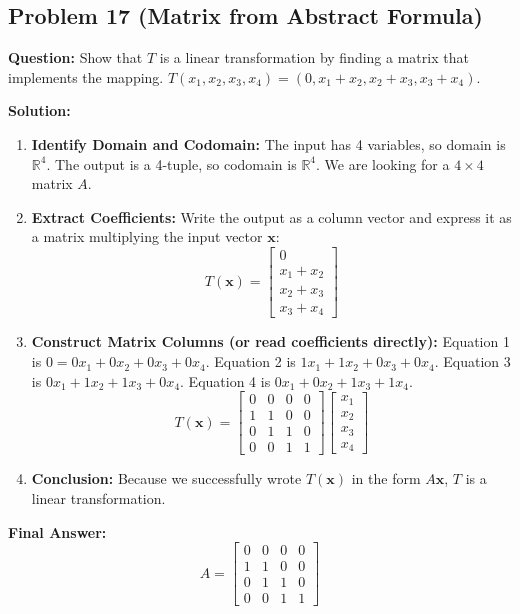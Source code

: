 \documentclass[11pt]{article}
\begin{document}
\subsection*{Problem 17 (Matrix from Abstract Formula)}
\textbf{Question:} Show that $T$ is a linear transformation by finding a matrix that implements the mapping. 
$T(x_1, x_2, x_3, x_4) = (0, x_1+x_2, x_2+x_3, x_3+x_4)$.

\textbf{Solution:}
\begin{enumerate}
    \item \textbf{Identify Domain and Codomain:} The input has 4 variables, so domain is $\mathbb{R}^4$. The output is a 4-tuple, so codomain is $\mathbb{R}^4$. We are looking for a $4 \times 4$ matrix $A$.
    \item \textbf{Extract Coefficients:} Write the output as a column vector and express it as a matrix multiplying the input vector $\mathbf{x}$:
    \[ T(\mathbf{x}) = \begin{bmatrix} 0 \\ x_1 + x_2 \\ x_2 + x_3 \\ x_3 + x_4 \end{bmatrix} \]
    \item \textbf{Construct Matrix Columns (or read coefficients directly):}
    Equation 1 is $0 = 0x_1 + 0x_2 + 0x_3 + 0x_4$.
    Equation 2 is $1x_1 + 1x_2 + 0x_3 + 0x_4$.
    Equation 3 is $0x_1 + 1x_2 + 1x_3 + 0x_4$.
    Equation 4 is $0x_1 + 0x_2 + 1x_3 + 1x_4$.
    \[ T(\mathbf{x}) = \begin{bmatrix} 0 & 0 & 0 & 0 \\ 1 & 1 & 0 & 0 \\ 0 & 1 & 1 & 0 \\ 0 & 0 & 1 & 1 \end{bmatrix} \begin{bmatrix} x_1 \\ x_2 \\ x_3 \\ x_4 \end{bmatrix} \]
    \item \textbf{Conclusion:} Because we successfully wrote $T(\mathbf{x})$ in the form $A\mathbf{x}$, $T$ is a linear transformation.
\end{enumerate}
\textbf{Final Answer:} \[ A = \begin{bmatrix} 0 & 0 & 0 & 0 \\ 1 & 1 & 0 & 0 \\ 0 & 1 & 1 & 0 \\ 0 & 0 & 1 & 1 \end{bmatrix} \]
\end{document}
